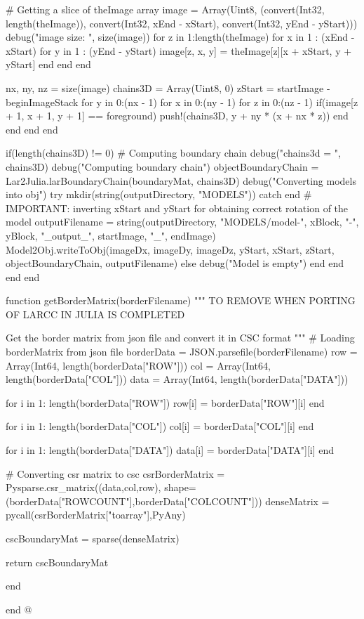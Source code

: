 \documentclass[11pt,oneside]{article}	%
\begin{document}
{      # Getting a slice of theImage array
      image = Array(Uint8, (convert(Int32, length(theImage)), convert(Int32, xEnd - xStart), convert(Int32, yEnd - yStart)))
      debug("image size: ", size(image))
      for z in 1:length(theImage)
        for x in 1 : (xEnd - xStart)
          for y in 1 : (yEnd - yStart)
            image[z, x, y] = theImage[z][x + xStart, y + yStart]
          end
        end
      end

      nx, ny, nz = size(image)
      chains3D = Array(Uint8, 0)
      zStart = startImage - beginImageStack
      for y in 0:(nx - 1)
        for x in 0:(ny - 1)
          for z in 0:(nz - 1)
            if(image[z + 1, x + 1, y + 1] == foreground)
              push!(chains3D, y + ny * (x + nx * z))
            end
          end
        end
      end

      if(length(chains3D) != 0)
        # Computing boundary chain
        debug("chains3d = ", chains3D)
        debug("Computing boundary chain")
        objectBoundaryChain = Lar2Julia.larBoundaryChain(boundaryMat, chains3D)
        debug("Converting models into obj")
        try
          mkdir(string(outputDirectory, "MODELS"))
        catch
        end
        # IMPORTANT: inverting xStart and yStart for obtaining correct rotation of the model
        outputFilename = string(outputDirectory, "MODELS/model-", xBlock, "-", yBlock, "_output_", startImage, "_", endImage)
        Model2Obj.writeToObj(imageDx, imageDy, imageDz, yStart, xStart, zStart, objectBoundaryChain, outputFilename)
      else
        debug("Model is empty")
      end
    end
  end
end

function getBorderMatrix(borderFilename)
  """
  TO REMOVE WHEN PORTING OF LARCC IN JULIA IS COMPLETED

  Get the border matrix from json file and convert it in
  CSC format
  """
  # Loading borderMatrix from json file
  borderData = JSON.parsefile(borderFilename)
  row = Array(Int64, length(borderData["ROW"]))
  col = Array(Int64, length(borderData["COL"]))
  data = Array(Int64, length(borderData["DATA"]))

  for i in 1: length(borderData["ROW"])
    row[i] = borderData["ROW"][i]
  end

  for i in 1: length(borderData["COL"])
    col[i] = borderData["COL"][i]
  end

  for i in 1: length(borderData["DATA"])
    data[i] = borderData["DATA"][i]
  end

  # Converting csr matrix to csc
  csrBorderMatrix = Pysparse.csr_matrix((data,col,row), shape=(borderData["ROWCOUNT"],borderData["COLCOUNT"]))
  denseMatrix = pycall(csrBorderMatrix["toarray"],PyAny)

  cscBoundaryMat = sparse(denseMatrix)

  return cscBoundaryMat

end

end
@}
\end{document}
